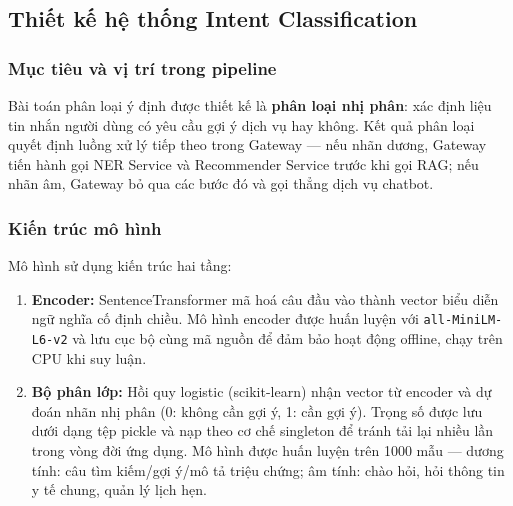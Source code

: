 \subsection{Thiết kế hệ thống Intent Classification}

\subsubsection{Mục tiêu và vị trí trong pipeline}

Bài toán phân loại ý định được thiết kế là \textbf{phân loại nhị phân}: xác định liệu tin nhắn người dùng có yêu cầu gợi ý dịch vụ hay không. Kết quả phân loại quyết định luồng xử lý tiếp theo trong Gateway — nếu nhãn dương, Gateway tiến hành gọi NER Service và Recommender Service trước khi gọi RAG; nếu nhãn âm, Gateway bỏ qua các bước đó và gọi thẳng dịch vụ chatbot.

\subsubsection{Kiến trúc mô hình}

Mô hình sử dụng kiến trúc hai tầng:

\begin{enumerate}
    \item \textbf{Encoder:} SentenceTransformer mã hoá câu đầu vào thành vector biểu diễn ngữ nghĩa cố định chiều. Mô hình encoder được huấn luyện với \texttt{all-MiniLM-L6-v2} và lưu cục bộ cùng mã nguồn để đảm bảo hoạt động offline, chạy trên CPU khi suy luận.
    \item \textbf{Bộ phân lớp:} Hồi quy logistic (scikit-learn) nhận vector từ encoder và dự đoán nhãn nhị phân (0: không cần gợi ý, 1: cần gợi ý). Trọng số được lưu dưới dạng tệp pickle và nạp theo cơ chế singleton để tránh tải lại nhiều lần trong vòng đời ứng dụng. Mô hình được huấn luyện trên 1000 mẫu — dương tính: câu tìm kiếm/gợi ý/mô tả triệu chứng; âm tính: chào hỏi, hỏi thông tin y tế chung, quản lý lịch hẹn.
\end{enumerate}

